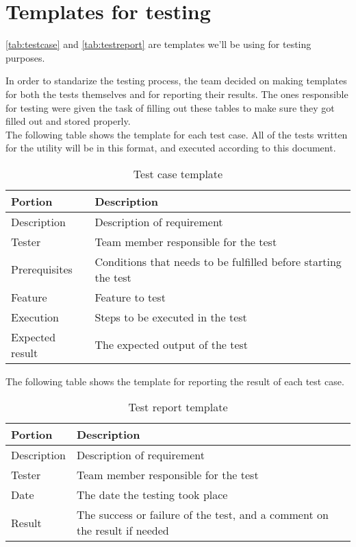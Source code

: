 \section{Templates for testing}
\autoref{tab:testcase} and \autoref{tab:testreport} are templates we'll be
using for testing purposes.

In order to standarize the testing process, the team decided on making templates for both the tests themselves and for reporting their results. The ones responsible for testing were given the task of filling out these tables to make sure they got filled out and stored properly.\\[0.5ex]

The following table shows the template for each test case. All of the tests written for the utility will be in this format, and executed according to this document.\\[0.5ex]

\begin{table}[ht] \small \center
\caption{Test case template \label{tab:testcase}}
\begin{tabular}{l l}
	\toprule
	Portion & Description \\
	\midrule
	Description & Description of requirement \\
	Tester & Team member responsible for the test \\
	Prerequisites & Conditions that needs to be fulfilled before starting the test \\
	Feature & Feature to test \\
	Execution & Steps to be executed in the test \\
	Expected result & The expected output of the test
	\bottomrule
\end{tabular}
\end{table}

The following table shows the template for reporting the result of each test case.\\[0.5ex]

\begin{table}[ht] \small \center
\caption{Test report template \label{tab:testreport}}
\begin{tabular}{l l}
	\toprule
	Portion & Description \\
	\midrule
	Description & Description of requirement \\
	Tester & Team member responsible for the test \\
	Date & The date the testing took place \\
	Result & The success or failure of the test, and a comment on the result if needed \\
	\bottomrule
\end{tabular}
\end{table}

